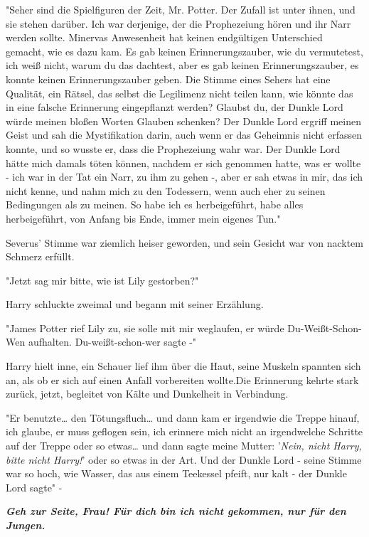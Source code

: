 {"Seher sind die Spielfiguren der Zeit, Mr. Potter. Der Zufall ist unter ihnen, und sie stehen darüber. Ich war derjenige, der die Prophezeiung hören und ihr Narr werden sollte. Minervas Anwesenheit hat keinen endgültigen Unterschied gemacht, wie es dazu kam. Es gab keinen Erinnerungszauber, wie du vermutetest, ich weiß nicht, warum du das dachtest, aber es gab keinen Erinnerungszauber, es konnte keinen Erinnerungszauber geben. Die Stimme eines Sehers hat eine Qualität, ein Rätsel, das selbst die Legilimenz nicht teilen kann, wie könnte das in eine falsche Erinnerung eingepflanzt werden? Glaubst du, der Dunkle Lord würde meinen bloßen Worten Glauben schenken? Der Dunkle Lord ergriff meinen Geist und sah die Mystifikation darin, auch wenn er das Geheimnis nicht erfassen konnte, und so wusste er, dass die Prophezeiung wahr war. Der Dunkle Lord hätte mich damals töten können, nachdem er sich genommen hatte, was er wollte - ich war in der Tat ein Narr, zu ihm zu gehen -, aber er sah etwas in mir, das ich nicht kenne, und nahm mich zu den Todessern, wenn auch eher zu seinen Bedingungen als zu meinen. So habe ich es herbeigeführt, habe alles herbeigeführt, von Anfang bis Ende, immer mein eigenes Tun."

Severus' Stimme war ziemlich heiser geworden, und sein Gesicht war von nacktem Schmerz erfüllt.

"Jetzt sag mir bitte, wie ist Lily gestorben?"

Harry schluckte zweimal und begann mit seiner Erzählung.

"James Potter rief Lily zu, sie solle mit mir weglaufen, er würde Du-Weißt-Schon-Wen aufhalten. Du-weißt-schon-wer sagte -"

Harry hielt inne, ein Schauer lief ihm über die Haut, seine Muskeln spannten sich an, als ob er sich auf einen Anfall vorbereiten wollte.Die Erinnerung kehrte stark zurück, jetzt, begleitet von Kälte und Dunkelheit in Verbindung.

"Er benutzte… den Tötungsfluch… und dann kam er irgendwie die Treppe hinauf, ich glaube, er muss geflogen sein, ich erinnere mich nicht an irgendwelche Schritte auf der Treppe oder so etwas… und dann sagte meine Mutter: '\emph{Nein, nicht Harry, bitte nicht Harry!}' oder so etwas in der Art. Und der Dunkle Lord - seine Stimme war so hoch, wie Wasser, das aus einem Teekessel pfeift, nur kalt - der Dunkle Lord sagte" -

\textbf{\emph{Geh zur Seite, Frau! Für dich bin ich nicht gekommen, nur für den Jungen.}}

}

